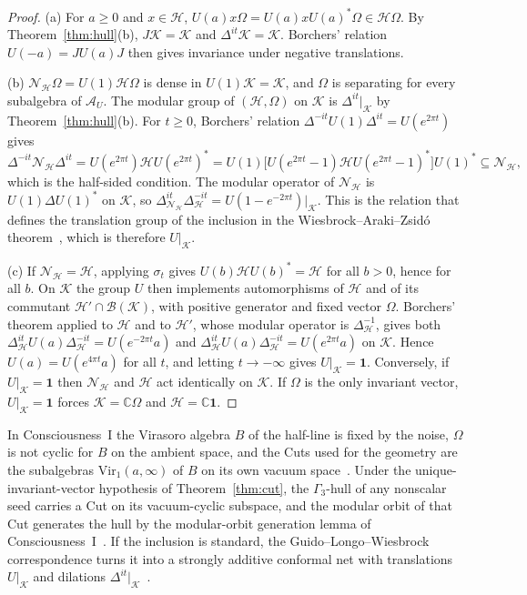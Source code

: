 \documentclass[12pt]{article}
\theoremstyle{definition}
\theoremstyle{remark}
\newcommand{\AU}{\mathcal A_U}
\begin{document}
\begin{proof}
(a) For \(a\ge0\) and \(x\in\mathcal H\), \(U(a)x\Omega=U(a)xU(a)^*\Omega\in\mathcal H\Omega\).
By Theorem~\ref{thm:hull}(b), \(J\mathcal K=\mathcal K\) and \(\Delta^{it}\mathcal K
=\mathcal K\). Borchers' relation \(U(-a)=JU(a)J\) then gives invariance under
negative translations.

(b) \(\mathcal N_{\mathcal H}\Omega=U(1)\mathcal H\Omega\) is dense in
\(U(1)\mathcal K=\mathcal K\), and \(\Omega\) is separating for every subalgebra of
\(\AU\). The modular group of \((\mathcal H,\Omega)\) on \(\mathcal K\) is
\(\Delta^{it}|_{\mathcal K}\) by Theorem~\ref{thm:hull}(b). For \(t\ge0\), Borchers'
relation \(\Delta^{-it}U(1)\Delta^{it}=U(e^{2\pi t})\) gives
\[
\Delta^{-it}\mathcal N_{\mathcal H}\Delta^{it}
=U(e^{2\pi t})\mathcal HU(e^{2\pi t})^*
=U(1)\bigl[U(e^{2\pi t}-1)\mathcal HU(e^{2\pi t}-1)^*\bigr]U(1)^*
\subseteq\mathcal N_{\mathcal H},
\]
which is the half-sided condition. The modular operator of \(\mathcal N_{\mathcal H}\)
is \(U(1)\Delta U(1)^*\) on \(\mathcal K\), so
\(\Delta_{\mathcal N_{\mathcal H}}^{it}\Delta_{\mathcal H}^{-it}=U(1-e^{-2\pi t})|_{\mathcal K}\).
This is the relation that defines the translation group of the inclusion in the
Wiesbrock--Araki--Zsid\'o theorem~\cite{Wiesbrock1993,AZ}, which is therefore
\(U|_{\mathcal K}\).

(c) If \(\mathcal N_{\mathcal H}=\mathcal H\), applying \(\sigma_t\) gives
\(U(b)\mathcal HU(b)^*=\mathcal H\) for all \(b>0\), hence for all \(b\). On
\(\mathcal K\) the group \(U\) then implements automorphisms of \(\mathcal H\) and of
its commutant \(\mathcal H'\cap\mathcal B(\mathcal K)\), with positive generator and
fixed vector \(\Omega\). Borchers' theorem applied to \(\mathcal H\) and to
\(\mathcal H'\), whose modular operator is \(\Delta_{\mathcal H}^{-1}\), gives both
\(\Delta_{\mathcal H}^{it}U(a)\Delta_{\mathcal H}^{-it}=U(e^{-2\pi t}a)\) and
\(\Delta_{\mathcal H}^{it}U(a)\Delta_{\mathcal H}^{-it}=U(e^{2\pi t}a)\) on
\(\mathcal K\). Hence \(U(a)=U(e^{4\pi t}a)\) for all \(t\), and letting
\(t\to-\infty\) gives \(U|_{\mathcal K}=\mathbf 1\). Conversely, if \(U|_{\mathcal K}=\mathbf 1\)
then \(\mathcal N_{\mathcal H}\) and \(\mathcal H\) act identically on \(\mathcal K\). If
\(\Omega\) is the only invariant vector, \(U|_{\mathcal K}=\mathbf 1\) forces
\(\mathcal K=\mathbb C\Omega\) and \(\mathcal H=\mathbb C\mathbf 1\).
\end{proof}

In Consciousness~I the Virasoro algebra \(B\) of the half-line is fixed by the noise,
\(\Omega\) is not cyclic for \(B\) on the ambient space, and the Cuts used for the
geometry are the subalgebras \(\mathrm{Vir}_1(a,\infty)\) of \(B\) on its own vacuum
space~\cite{PaperI}. Under the unique-invariant-vector hypothesis of
Theorem~\ref{thm:cut}, the \(\Gamma_3\)-hull of any nonscalar seed carries a Cut
on its vacuum-cyclic subspace, and the modular
orbit of that Cut generates the hull by the modular-orbit generation lemma
of Consciousness~I~\cite{PaperI}. If the inclusion is
standard, the Guido--Longo--Wiesbrock correspondence turns it into a strongly additive
conformal net with translations \(U|_{\mathcal K}\) and dilations
\(\Delta^{it}|_{\mathcal K}\)~\cite{GLW}.
\end{document}
